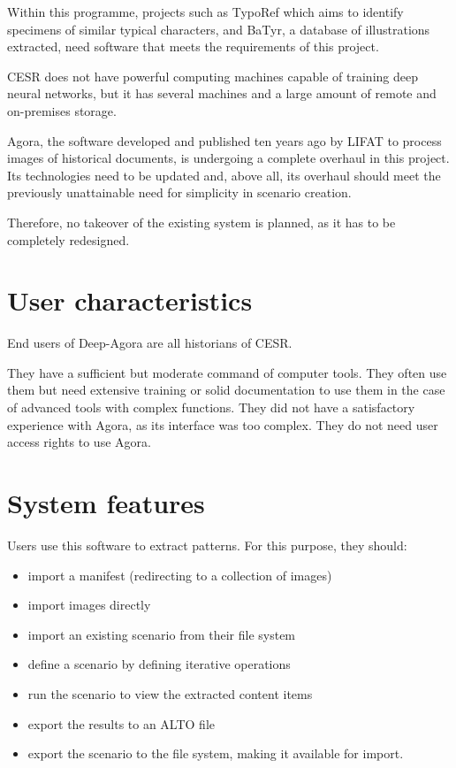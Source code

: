 \documentclass{polytech/polytech}
\numberwithin{figure}{chapter}
\begin{document}
Within this programme, projects such as TypoRef which aims to identify specimens of similar typical characters, and BaTyr, a database of illustrations extracted, need software that meets the requirements of this project.

CESR does not have powerful computing machines capable of training deep neural networks, but it has several machines and a large amount of remote and on-premises storage.

Agora, the software developed and published ten years ago by LIFAT to process images of historical documents, is undergoing a complete overhaul in this project.
Its technologies need to be updated and, above all, its overhaul should meet the previously unattainable need for simplicity in scenario creation.

Therefore, no takeover of the existing system is planned, as it has to be completely redesigned.


\section{User characteristics}

End users of Deep-Agora are all historians of CESR.

They have a sufficient but moderate command of computer tools.
They often use them but need extensive training or solid documentation to use them in the case of advanced tools with complex functions.
They did not have a satisfactory experience with Agora, as its interface was too complex.
They do not need user access rights to use Agora.


\section{System features}

Users use this software to extract patterns.
For this purpose, they should:
\begin{itemize}
\item import a manifest (redirecting to a collection of images)
\item import images directly
\item import an existing scenario from their file system
\item define a scenario by defining iterative operations
\item run the scenario to view the extracted content items
\item export the results to an ALTO file
\item export the scenario to the file system, making it available for import.
\end{itemize}
\end{document}
